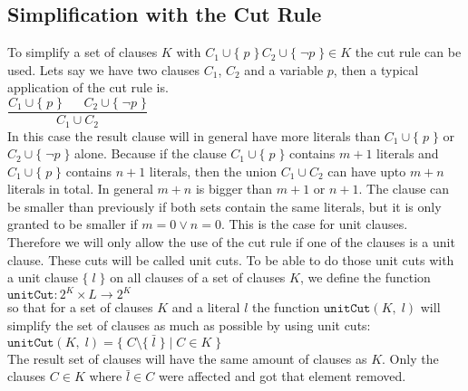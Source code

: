 \subsection{Simplification with the Cut Rule}
\label{sub:sciDavisPutnamCutRule}
To simplify a set of clauses $K$ with $C_1 \cup \{\; p\; \}\, C_2 \cup \{\; \neg p\; \} \in K$ the cut rule can be used. Lets say we have two clauses $C_1$, $C_2$ and a variable $p$, then a typical application of the cut rule is.
\\[0.2cm]
\hspace*{1.3cm} $\dfrac{C_1 \cup \{\; p\; \} \;\;\;\;\;\; C_2 \cup \{\; \neg p\; \}}{C_1 \cup C_2}$
\\[0.2cm]
In this case the result clause will in general have more literals than $C_1 \cup \{\; p\; \}$ or $C_2 \cup \{\; \neg p\; \}$ alone. Because if the clause $C_1 \cup \{\; p\; \}$ contains $m + 1$ literals and $C_1 \cup \{\; p\; \}$ contains $n + 1$ literals, then the union $C_1 \cup C_2$ can have upto $m + n$ literals in total. In general $m + n$ is bigger than $m + 1$ or $n + 1$. The clause can be smaller than previously if both sets contain the same literals, but it is only granted to be smaller if $m = 0 \lor n = 0$. This is the case for unit clauses. Therefore we will only allow the use of the cut rule if one of the clauses is a unit clause. These cuts will be called unit cuts. To be able to do those unit cuts with a unit clause $\{\; l\; \}$ on all clauses of a set of clauses $K$, we define the function
\\[0.2cm]
\hspace*{1.3cm} $\texttt{unitCut}: 2^{K} \times L \to 2^{K}$
\\[0.2cm]
so that for a set of clauses $K$ and a literal $l$ the function $\texttt{unitCut}(K,\; l)$ will simplify the set of clauses as much as possible by using unit cuts:
\\[0.2cm]
\hspace*{1.3cm} $\texttt{unitCut}(K,\; l) = \{\; C \setminus \{\; \bar{l}\; \}\; |\; C \in K\; \}$
\\[0.2cm]
The result set of clauses will have the same amount of clauses as $K$. Only the clauses $C \in K$ where $\bar{l} \in C$ were affected and got that element removed. \cite{Stroetman2019}

